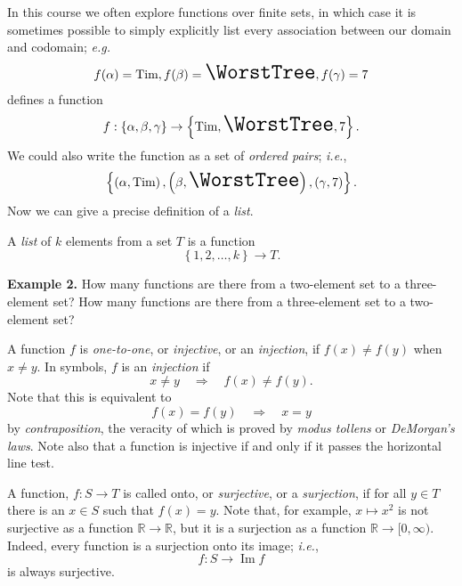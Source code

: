 \documentclass[12pt, letterpaper]{article}
\theoremstyle{definition}
\DeclareMathOperator{\Ima}{Im}
\begin{document}
In this course we often explore functions over finite sets, in which case
it is sometimes possible to simply explicitly list every association between
our domain and codomain; \emph{e.g.}
\begin{eqnarray}
    f(\alpha) = \text{Tim}, f(\beta) = \text{\LARGE\WorstTree}, f(\gamma) = 7
\end{eqnarray}
defines a function
\begin{equation*}
    f : \left\{ \alpha, \beta, \gamma \right\} \to \left\{ \text{Tim}, \text{\LARGE\WorstTree}, 7 \right\}.
\end{equation*}
We could also write the function as a set of \emph{ordered pairs}; \emph{i.e.},
\begin{equation*}
    \left\{ \left(\alpha, \text{Tim}\right), \left( \beta, \text{\LARGE\WorstTree} \right), \left( \gamma, 7 \right) \right\}.
\end{equation*}
Now we can give a precise definition of a \emph{list}.

A \emph{list} of $k$ elements from a set $T$ is a function
\begin{equation*}
    \left\{ 1, 2, \dots, k \right\} \to T.
\end{equation*}

\vspace*{0.1in}\noindent
\textbf{Example 2.}
How many functions are there from a two-element set to a three-element set?
How many functions are there from a three-element set to a two-element set?


\clearpage\pagebreak\noindent
A function $f$ is \emph{one-to-one}, or \emph{injective}, or an \emph{injection},
if $f(x) \neq f(y)$ when $x \neq y$. In symbols, $f$ is an \emph{injection} if
\begin{equation*}
    x \neq y \quad\Rightarrow\quad f(x) \neq f(y).
\end{equation*}
Note that this is equivalent to
\begin{equation*}
    f(x) = f(y) \quad\Rightarrow\quad x = y
\end{equation*}
by \emph{contraposition}, the veracity of which is proved by \emph{modus tollens}
or \emph{DeMorgan's laws}. Note also that a function is injective if and only if
it passes the horizontal line test.

A function, $f : S \to T$ is called onto, or \emph{surjective}, or a \emph{surjection},
if for all $y \in T$ there is an $x \in S$ such that $f(x) = y$. Note that,
for example, $x \mapsto x^2$ is not surjective as a function
$\mathbb{R} \to \mathbb{R}$, but it is a surjection as a function
$\mathbb{R} \to [ 0, \infty )$. Indeed, every function is a surjection onto
its image; \emph{i.e.},
\begin{equation*}
    f : S \to \Ima f
\end{equation*}
is always surjective.
\end{document}
